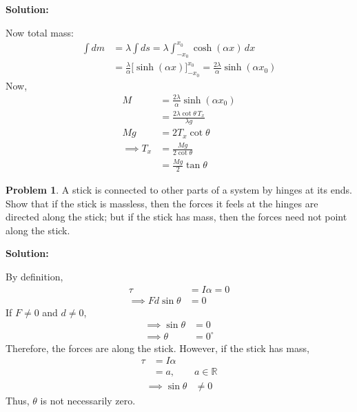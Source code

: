 \documentclass{article}
\theoremstyle{definition}
\newtheorem{problem}{Problem}
\newenvironment{solution}
  {\par\vspace{0.5em}\noindent\textbf{Solution:}\par\nopagebreak\vspace{0.3em}}
  {\par\vspace{1em}}
\begin{document}
\begin{solution}
\begin{enumerate}
        Now total mass:
        \begin{align*}
            \int dm &= \lambda \int ds = \lambda \int_{-x_0}^{x_0} \cosh(\alpha x) \, dx \\
                    &= \frac{\lambda}{\alpha} \Big[ \sinh(\alpha x) \Big]_{-x_0}^{x_0} = \frac{2\lambda}{\alpha} \sinh(\alpha x_0)
        \end{align*}
        Now,
        \begin{align*}
            M &= \frac{2\lambda}{\alpha} \sinh(\alpha x_0) \\
              &= \frac{2\lambda \cot\theta \, T_x}{\lambda g} \\[0.5em]
            Mg &= 2 T_x \cot\theta \\
            \implies T_x &= \frac{Mg}{2 \cot\theta} \\
                         &= \frac{Mg}{2} \tan\theta
        \end{align*}
    \end{enumerate}
\end{solution}
\begin{problem}
    \begin{minipage}[t]{0.95\textwidth}
        A stick is connected to other parts of a system by hinges at its ends. Show that if the stick is massless, then the forces it feels at the hinges are directed along the stick; but if the stick has mass, then the forces need not point along the stick.
    \end{minipage}
\end{problem}
\begin{solution}
    By definition,
    \begin{align*}
    \tau &= I\alpha = 0 \\
    \implies Fd\sin\theta &= 0
    \end{align*}
    If $F \neq 0$ and $d \neq 0$,
    \begin{align*}
    \implies \sin\theta &= 0 \\
    \implies \theta &= 0^\circ
    \end{align*}
    Therefore, the forces are along the stick.
    However, if the stick has mass,
    \begin{align*}
    \tau &= I\alpha \\
    &= a, \qquad a \in \mathbb{R}
    \end{align*}
    \begin{align*}
    \implies \sin\theta &\neq 0
    \end{align*}
    Thus, $\theta$ is not necessarily zero.
\end{solution}
\end{document}
